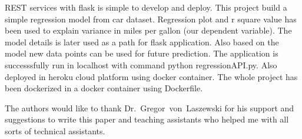 REST services with flask is simple to develop and deploy. 
This project build a
simple regression model from car dataset. Regression plot and r square
value has been used to explain variance in miles per gallon (our dependent
variable). The model details is later used as 
a path for flask application. Also based on the model new data points can be 
used for future prediction. The application is successsfully run in localhost
with command python regressionAPI.py. Also deployed in heroku cloud platform 
using docker container. The whole project has been dockerized in
a docker container using Dockerfile. 




\begin{acks}

  The authors would like to thank Dr.~Gregor~von~Laszewski for his
  support and suggestions to write this paper and teaching assistants who
  helped me with all sorts of technical assistants.

\end{acks}




 
